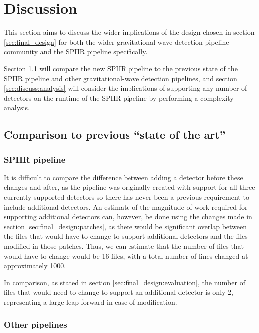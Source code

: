 \documentclass{article}
\begin{document}
\section{Discussion} \label{sec:discuss}

This section aims to discuss the wider implications of the design chosen in section \ref{sec:final_design} for both the wider gravitational-wave detection pipeline community and the SPIIR pipeline specifically.

Section \ref{sec:discuss:comparison} will compare the new SPIIR pipeline to the previous state of the SPIIR pipeline and other gravitational-wave detection pipelines, and section \ref{sec:discuss:analysis} will consider the implications of supporting any number of detectors on the runtime of the SPIIR pipeline by performing a complexity analysis.

\subsection{Comparison to previous ``state of the art''} \label{sec:discuss:comparison}

\subsubsection{SPIIR pipeline}

It is difficult to compare the difference between adding a detector before these changes and after, as the pipeline was originally created with support for all three currently supported detectors so there has never been a previous requirement to include additional detectors.
An estimate of the magnitude of work required for supporting additional detectors can, however, be done using the changes made in section \ref{sec:final_design:patches}, as there would be significant overlap between the files that would have to change to support additional detectors and the files modified in those patches.
Thus, we can estimate that the number of files that would have to change would be 16 files, with a total number of lines changed at approximately 1000.

In comparison, as stated in section \ref{sec:final_design:evaluation}, the number of files that would need to change to support an additional detector is only 2, representing a large leap forward in ease of modification.

\subsubsection{Other pipelines}
\end{document}
